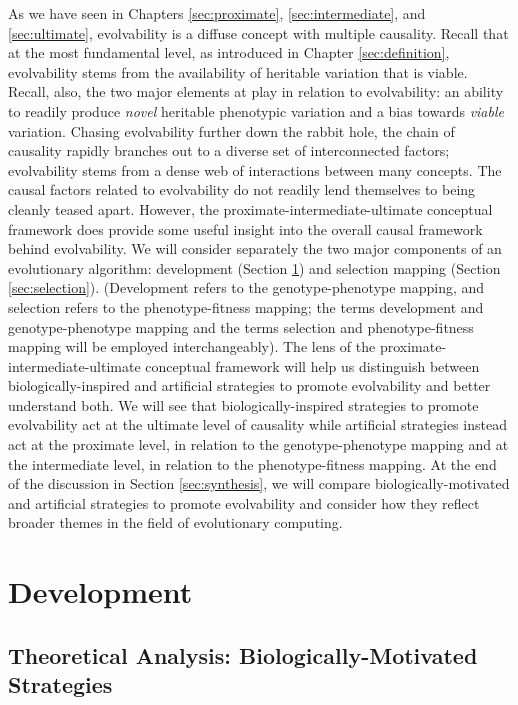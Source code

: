 As we have seen in Chapters \ref{sec:proximate}, \ref{sec:intermediate}, and \ref{sec:ultimate}, evolvability is a diffuse concept with multiple causality.
Recall that at the most fundamental level, as introduced in Chapter \ref{sec:definition}, evolvability stems from the availability of heritable variation that is viable.
Recall, also, the two major elements at play in relation to evolvability: an ability to readily produce \textit{novel} heritable phenotypic variation and a bias towards \textit{viable} variation.
Chasing evolvability further down the rabbit hole, the chain of causality rapidly branches out to a diverse set of interconnected factors; evolvability stems from a dense web of interactions between many concepts.
The causal factors related to evolvability do not readily lend themselves to being cleanly teased apart.
However, the proximate-intermediate-ultimate conceptual framework does provide some useful insight into the overall causal framework behind evolvability.
We will consider separately the two major components of an evolutionary algorithm: development (Section \ref{sec:development}) and selection mapping (Section \ref{sec:selection}).
(Development refers to the genotype-phenotype mapping, and selection refers to the phenotype-fitness mapping; the terms development and genotype-phenotype mapping and the terms selection and phenotype-fitness mapping will be employed interchangeably).
The lens of the proximate-intermediate-ultimate conceptual framework will help us distinguish between biologically-inspired and artificial strategies to promote evolvability and better understand both.
We will see that biologically-inspired strategies to promote evolvability act at the ultimate level of causality while artificial strategies instead act at the proximate level, in relation to the genotype-phenotype mapping and at the intermediate level, in relation to the phenotype-fitness mapping.
At the end of the discussion in Section \ref{sec:synthesis}, we will compare biologically-motivated and artificial strategies to promote evolvability and consider how they reflect broader themes in the field of evolutionary computing.


\section{Development} \label{sec:development}
\subsection{Theoretical Analysis: Biologically-Motivated Strategies}

